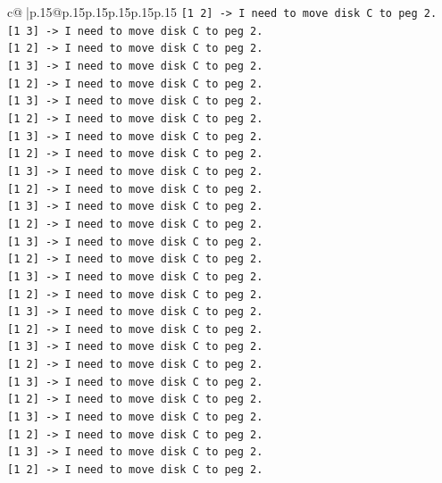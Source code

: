 \documentclass{article}
\begin{document}
{\begin{supertabular}{c@{$\;$}|p{.15\linewidth}@{}p{.15\linewidth}p{.15\linewidth}p{.15\linewidth}p{.15\linewidth}p{.15\linewidth}}
{{{\texttt{{[}1 2{]} {-}> I need to move disk C to peg 2.} \\
\texttt{{[}1 3{]} {-}> I need to move disk C to peg 2.} \\
\texttt{{[}1 2{]} {-}> I need to move disk C to peg 2.} \\
\texttt{{[}1 3{]} {-}> I need to move disk C to peg 2.} \\
\texttt{{[}1 2{]} {-}> I need to move disk C to peg 2.} \\
\texttt{{[}1 3{]} {-}> I need to move disk C to peg 2.} \\
\texttt{{[}1 2{]} {-}> I need to move disk C to peg 2.} \\
\texttt{{[}1 3{]} {-}> I need to move disk C to peg 2.} \\
\texttt{{[}1 2{]} {-}> I need to move disk C to peg 2.} \\
\texttt{{[}1 3{]} {-}> I need to move disk C to peg 2.} \\
\texttt{{[}1 2{]} {-}> I need to move disk C to peg 2.} \\
\texttt{{[}1 3{]} {-}> I need to move disk C to peg 2.} \\
\texttt{{[}1 2{]} {-}> I need to move disk C to peg 2.} \\
\texttt{{[}1 3{]} {-}> I need to move disk C to peg 2.} \\
\texttt{{[}1 2{]} {-}> I need to move disk C to peg 2.} \\
\texttt{{[}1 3{]} {-}> I need to move disk C to peg 2.} \\
\texttt{{[}1 2{]} {-}> I need to move disk C to peg 2.} \\
\texttt{{[}1 3{]} {-}> I need to move disk C to peg 2.} \\
\texttt{{[}1 2{]} {-}> I need to move disk C to peg 2.} \\
\texttt{{[}1 3{]} {-}> I need to move disk C to peg 2.} \\
\texttt{{[}1 2{]} {-}> I need to move disk C to peg 2.} \\
\texttt{{[}1 3{]} {-}> I need to move disk C to peg 2.} \\
\texttt{{[}1 2{]} {-}> I need to move disk C to peg 2.} \\
\texttt{{[}1 3{]} {-}> I need to move disk C to peg 2.} \\
\texttt{{[}1 2{]} {-}> I need to move disk C to peg 2.} \\
\texttt{{[}1 3{]} {-}> I need to move disk C to peg 2.} \\
\texttt{{[}1 2{]} {-}> I need to move disk C to peg 2.} \\
}}}
\end{supertabular}}
\end{document}
